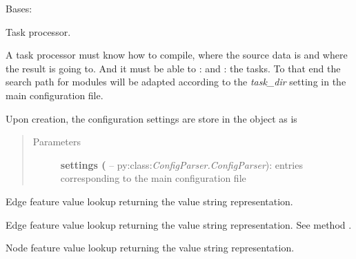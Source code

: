 \documentclass[letterpaper,10pt,english]{sphinxmanual}
\begin{document}
\begin{fulllineitems}
\label{graf/graf:graf.task.GrafTask}
Bases: {\hyperref[graf/graf:graf.graf.Graf]{}}

Task processor.

A task processor must know how to compile, where the source data is and where the result is going to.
And it must be able to \href{http://docs.python.org/reference/simple\_stmts.html\#import}{}: and \href{http://docs.python.org/library/functions.html\#reload}{}: the tasks.
To that end the search path for modules will be adapted according to the \emph{task\_dir} setting
in the main configuration file.

Upon creation, the configuration settings are store in the object as is
\begin{quote}\begin{description}
\item[{Parameters}] \leavevmode
\textbf{settings (} --
py:class:\emph{ConfigParser.ConfigParser}): entries corresponding to the main configuration file

\end{description}\end{quote}

\begin{fulllineitems}
\label{graf/graf:graf.task.GrafTask.FEi}
Edge feature value lookup returning the value string representation.

\end{fulllineitems}


\begin{fulllineitems}
\label{graf/graf:graf.task.GrafTask.FEr}
Edge feature value lookup returning the value string representation.
See method {\hyperref[graf/graf:graf.task.GrafTask.FEi]{}}.

\end{fulllineitems}


\begin{fulllineitems}
\label{graf/graf:graf.task.GrafTask.FNi}
Node feature value lookup returning the value string representation.


\end{fulllineitems}
\end{fulllineitems}
\end{document}
